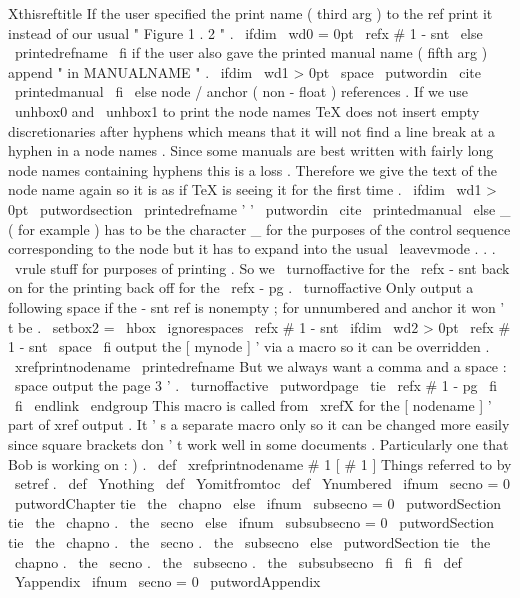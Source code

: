 {{{Xthisreftitle
%
If
the
user
specified
the
print
name
(
third
arg
)
to
the
ref
%
print
it
instead
of
our
usual
"
Figure
1
.
2
"
.
\
ifdim
\
wd0
=
0pt
\
refx
{
#
1
-
snt
}
{
}
%
\
else
\
printedrefname
\
fi
%
%
if
the
user
also
gave
the
printed
manual
name
(
fifth
arg
)
append
%
"
in
MANUALNAME
"
.
\
ifdim
\
wd1
>
0pt
\
space
\
putwordin
{
}
\
cite
{
\
printedmanual
}
%
\
fi
\
else
%
node
/
anchor
(
non
-
float
)
references
.
%
%
If
we
use
\
unhbox0
and
\
unhbox1
to
print
the
node
names
TeX
does
not
%
insert
empty
discretionaries
after
hyphens
which
means
that
it
will
%
not
find
a
line
break
at
a
hyphen
in
a
node
names
.
Since
some
manuals
%
are
best
written
with
fairly
long
node
names
containing
hyphens
this
%
is
a
loss
.
Therefore
we
give
the
text
of
the
node
name
again
so
it
%
is
as
if
TeX
is
seeing
it
for
the
first
time
.
\
ifdim
\
wd1
>
0pt
\
putwordsection
{
}
\
printedrefname
'
'
\
putwordin
{
}
\
cite
{
\
printedmanual
}
%
\
else
%
_
(
for
example
)
has
to
be
the
character
_
for
the
purposes
of
the
%
control
sequence
corresponding
to
the
node
but
it
has
to
expand
%
into
the
usual
\
leavevmode
.
.
.
\
vrule
stuff
for
purposes
of
%
printing
.
So
we
\
turnoffactive
for
the
\
refx
-
snt
back
on
for
the
%
printing
back
off
for
the
\
refx
-
pg
.
{
\
turnoffactive
%
Only
output
a
following
space
if
the
-
snt
ref
is
nonempty
;
for
%
unnumbered
and
anchor
it
won
'
t
be
.
\
setbox2
=
\
hbox
{
\
ignorespaces
\
refx
{
#
1
-
snt
}
{
}
}
%
\
ifdim
\
wd2
>
0pt
\
refx
{
#
1
-
snt
}
\
space
\
fi
}
%
%
output
the
[
mynode
]
'
via
a
macro
so
it
can
be
overridden
.
\
xrefprintnodename
\
printedrefname
%
%
But
we
always
want
a
comma
and
a
space
:
\
space
%
%
output
the
page
3
'
.
\
turnoffactive
\
putwordpage
\
tie
\
refx
{
#
1
-
pg
}
{
}
%
\
fi
\
fi
\
endlink
\
endgroup
}
%
This
macro
is
called
from
\
xrefX
for
the
[
nodename
]
'
part
of
xref
%
output
.
It
'
s
a
separate
macro
only
so
it
can
be
changed
more
easily
%
since
square
brackets
don
'
t
work
well
in
some
documents
.
Particularly
%
one
that
Bob
is
working
on
:
)
.
%
\
def
\
xrefprintnodename
#
1
{
[
#
1
]
}
%
Things
referred
to
by
\
setref
.
%
\
def
\
Ynothing
{
}
\
def
\
Yomitfromtoc
{
}
\
def
\
Ynumbered
{
%
\
ifnum
\
secno
=
0
\
putwordChapter
tie
\
the
\
chapno
\
else
\
ifnum
\
subsecno
=
0
\
putwordSection
tie
\
the
\
chapno
.
\
the
\
secno
\
else
\
ifnum
\
subsubsecno
=
0
\
putwordSection
tie
\
the
\
chapno
.
\
the
\
secno
.
\
the
\
subsecno
\
else
\
putwordSection
tie
\
the
\
chapno
.
\
the
\
secno
.
\
the
\
subsecno
.
\
the
\
subsubsecno
\
fi
\
fi
\
fi
}
\
def
\
Yappendix
{
%
\
ifnum
\
secno
=
0
\
putwordAppendix
}}}
